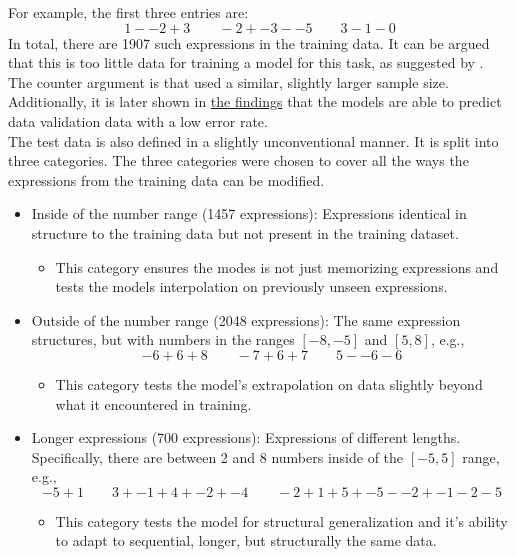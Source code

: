 \documentclass{article}
\begin{document}
For example, the first three entries are:
\[
1 - -2 + 3 \qquad -2 + -3 - -5 \qquad 3 - 1 - 0
\]
In total, there are 1907 such expressions in the training data. It can be argued that this is too little data for training a model for this task, as suggested by \cite{baka}. The counter argument is that \cite{trask2018neuralarithmeticlogicunits} used a similar, slightly larger sample size. Additionally, it is later shown in \href{https://github.com/AntonStantan/matura/blob/main/documentation/findings/findings.pdf}{the findings} that the models are able to predict data validation data with a low error rate.
\\[2em]
The test data is also defined in a slightly unconventional manner. It is split into three categories. The three categories were chosen to cover all the ways the expressions from the training data can be modified.
\begin{itemize}
    \item Inside of the number range (1457 expressions): Expressions identical in structure to the training data but not present in the training dataset. 
    \begin{itemize}
        \item[$\qquad\hookrightarrow$]This category ensures the modes is not just memorizing expressions and tests the models interpolation on previously unseen expressions.
    \end{itemize}
    \item Outside of the number range (2048 expressions): The same expression structures, but with numbers in the ranges $[-8, -5]$ and $[5, 8]$, e.g.,
\[
-6 + 6 + 8 \qquad -7 + 6 + 7 \qquad 5 - -6 - 6
\]
    \begin{itemize}
        \item[$\qquad\hookrightarrow$]This category tests the model's extrapolation on data slightly beyond what it encountered in training.
    \end{itemize}
    \item Longer expressions (700 expressions): Expressions of different lengths. Specifically, there are between 2 and 8 numbers inside of the $[-5, 5]$ range, e.g.,
\[
-5 + 1 \qquad 3 + -1 + 4 + -2 + -4 \qquad -2 + 1 + 5 + -5 - -2 + -1 - 2 - 5
\]
    \begin{itemize}
        \item[$\qquad\hookrightarrow$]This category tests the model for structural generalization and it's ability to adapt to sequential, longer, but structurally the same data.
    \end{itemize}
\end{itemize}
\end{document}

